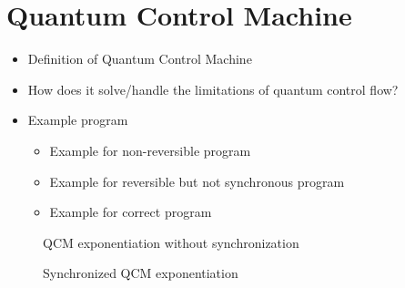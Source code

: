 \section{Quantum Control Machine}
\begin{itemize}
    \item Definition of Quantum Control Machine
    \item How does it solve/handle the limitations of quantum control flow?
    \item Example program
    \begin{itemize}
        \item Example for non-reversible program
        \item Example for reversible but not synchronous program
        \item Example for correct program
    \end{itemize}
\end{itemize}


\begin{figure}[htp]
    \centering     
    \begin{minipage}{.40\textwidth}
        \vspace{7.5em}
        
        \caption{QCM exponentiation without synchronization}
        \label{fig:qcm_not_sync}
    \end{minipage}
    \hfill
    \begin{minipage}{.55\textwidth}
        
        \caption{Synchronized QCM exponentiation}    
        \label{fig:qcm_sync}
    \end{minipage}
\end{figure}